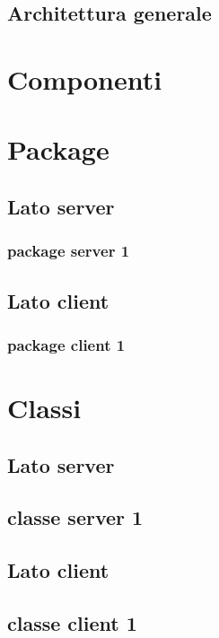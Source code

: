 \documentclass[a4paper]{article}
\begin{document}
		\subsection{Architettura generale} 
 
	 
	\newpage 
	\section{Componenti}
	
	\newpage 
	\section{Package}
		\subsection{Lato server}
			\subsubsection{package server 1}
				
		\subsection{Lato client}
			\subsubsection{package client 1}
	\newpage 
	\section{Classi}
		\subsection{Lato server}
			\subsection{classe server 1}
		\subsection{Lato client}
			\subsection{classe client 1}
	\newpage 
\end{document}
